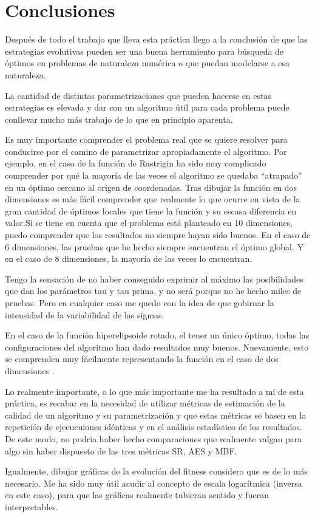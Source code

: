\documentclass[11pt]{article}
\begin{document}
    \section{Conclusiones}\label{conclusiones}

Después de todo el trabajo que lleva esta práctica llego a la conclusión
de que las estrategias evolutivas pueden ser una buena herramiento para
búsqueda de óptimos en problemas de naturaleza numérica o que puedan
modelarse a esa naturaleza.

La cantidad de distintas parametrizaciones que pueden hacerse en estas
estrategias es elevada y dar con un algoritmo útil para cada problema
puede conllevar mucho más trabajo de lo que en principio aparenta.

Es muy importante comprender el problema real que se quiere resolver
para conducirse por el camino de parametrizar apropiadamente el
algoritmo. Por ejemplo, en el caso de la función de Rastrigin ha sido
muy complicado comprender por qué la mayoría de las veces el algoritmo
se quedaba ``atrapado'' en un óptimo cercano al origen de coordenadas.
Tras dibujar la función en dos dimensiones es más fácil comprender que
realmente lo que ocurre en vista de la gran cantidad de óptimos locales
que tiene la función y su escasa diferencia en valor.Si se tiene en
cuenta que el problema está planteado en 10 dimensiones, puedo
comprender que los resultados no siempre hayan sido buenos. En el caso
de 6 dimensiones, las pruebas que he hecho siempre encuentran el óptimo
global. Y en el caso de 8 dimensiones, la mayoría de las veces lo
encuentran.

Tengo la sensación de no haber conseguido exprimir al máximo las
posibilidades que dan los parámetros tau y tau prima, y no será porque
no he hecho miles de pruebas. Pero en cualquier caso me quedo con la
idea de que gobirnar la intensidad de la variabilidad de las sigmas.

En el caso de la función hiperelipsoide rotado, el tener un único
óptimo, todas las configuraciones del algoritmo han dado resultados muy
buenos. Nuevamente, esto se comprenden muy fácilmente representando la
función en el caso de dos dimensiones .

Lo realmente importante, o lo que más importante me ha resultado a mí de
esta práctica, es recabar en la necesidad de utilizar métricas de
estimación de la calidad de un algoritmo y su parametrización y que
estas métricas se basen en la repetición de ejecucuiones idénticas y en
el análisis estadístico de los resultados. De este modo, no podria haber
hecho comparaciones que realmente valgan para algo sin haber dispuesto
de las tres métricas SR, AES y MBF.

Igualmente, dibujar gráficas de la evolución del fitness considero que
es de lo más necesario. Me ha sido muy útil acudir al concepto de escala
logarítmica (inversa en este caso), para que las gráficas realmente
tubieran sentido y fueran interpretables.


    
    
    
    
\end{document}
